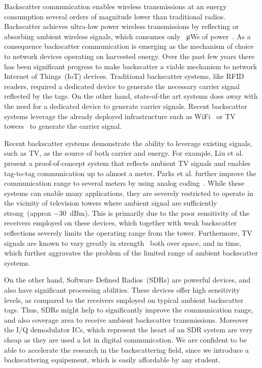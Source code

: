Backscatter communication enables wireless transmissions
at an energy consumption several orders of magnitude
lower than traditional radios. Backscatter achieves ultra-low
power wireless transmissions by reflecting or absorbing ambient
wireless signals, which consumes only 
\SI{}{\micro\watt}s of power~\cite{liu_ambient_2013}. 
As a consequence backscatter
communication is emerging as the mechanism of choice to network
devices operating on harvested energy.  
Over the past few years there has been significant progress
to make backscatter a viable mechanism to network Internet of
Things~(IoT) devices. Traditional backscatter systems, like RFID readers, required a
dedicated device to generate the necessary carrier signal
reflected by the tags. On the other hand, state-of-the art systems does away
with the need for a dedicated device to generate carrier signals.  Recent
backscatter systems leverage the already deployed infrastructure such as
WiFi~\cite{hitchhike,kellogg2015wi} or TV
towers~\cite{liu_ambient_2013,parks_turbocharging_2014} to generate the carrier
signal. %

Recent backscatter systems demonstrate the ability to leverage
existing signals, such as TV, as the source of both carrier and energy. For
example, Liu et al. present a proof-of-concept system that reflects
ambient TV signals and enables tag-to-tag communication up to almost a
meter. Parks et al. further improve the communication range to several
meters by using analog coding~\cite{parks_turbocharging_2014}. While
these systems can enable many applications, they are severely restricted
to operate in the vicinity of television towers where ambient signal
are sufficiently strong~(approx
\SI{-30}{dBm}). This is primarily due to the poor sensitivity of the receivers
employed on these devices, which together with weak backscatter reflections 
severely limits the operating range from the tower.
Furthermore, TV signals are known to vary greatly in
strength~\cite{wang_fm_2017} both over space, and in time,  which further aggravates the
problem of the limited range of ambient backscatter systems.

On the other hand, Software Defined Radios~(SDRs) are powerful devices, and also
have significant processing abilities. These devices offer high
sensitivity levels, as compared to the receivers employed on typical 
ambient backscatter tags. Thus, SDRs might help to
significantly improve the communication range, and also coverage 
area to receive ambient backscatter transmissions. Moreover the I/Q demodulator ICs, which represent the heart of an SDR system are very cheap as they are used a lot in digital communication. We are confident to be able to accelerate the research in the backscattering field, since we introduce a backscattering equipement, which is easily affordable by any student.   

